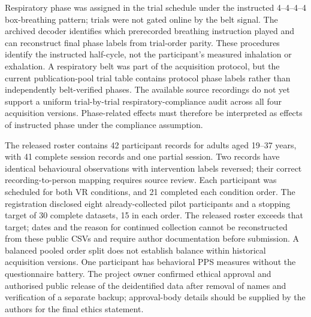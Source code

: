 Respiratory phase was assigned in the trial schedule under the instructed 4--4--4--4 box-breathing pattern; trials were not gated online by the belt signal. The archived decoder identifies which prerecorded breathing instruction played and can reconstruct final phase labels from trial-order parity. These procedures identify the instructed half-cycle, not the participant's measured inhalation or exhalation. A respiratory belt was part of the acquisition protocol, but the current publication-pool trial table contains protocol phase labels rather than independently belt-verified phases. The available source recordings do not yet support a uniform trial-by-trial respiratory-compliance audit across all four acquisition versions. Phase-related effects must therefore be interpreted as effects of instructed phase under the compliance assumption.

The released roster contains 42 participant records for adults aged 19--37 years, with 41 complete session records and one partial session. Two records have identical behavioural observations with intervention labels reversed; their correct recording-to-person mapping requires source review. Each participant was scheduled for both VR conditions, and 21 completed each condition order. The registration disclosed eight already-collected pilot participants and a stopping target of 30 complete datasets, 15 in each order. The released roster exceeds that target; dates and the reason for continued collection cannot be reconstructed from these public CSVs and require author documentation before submission. A balanced pooled order split does not establish balance within historical acquisition versions. One participant has behavioral PPS measures without the questionnaire battery. The project owner confirmed ethical approval and authorised public release of the deidentified data after removal of names and verification of a separate backup; approval-body details should be supplied by the authors for the final ethics statement.

